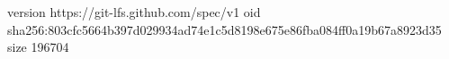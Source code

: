 version https://git-lfs.github.com/spec/v1
oid sha256:803cfc5664b397d029934ad74e1c5d8198e675e86fba084ff0a19b67a8923d35
size 196704
